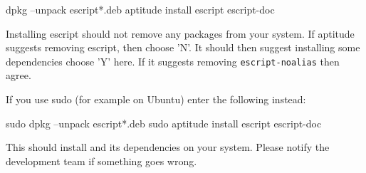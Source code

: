 \begin{shellCode}
dpkg --unpack escript*.deb
aptitude install escript escript-doc
\end{shellCode}

Installing escript should not remove any packages from your system.
If aptitude suggests removing escript, then choose 'N'.
It should then suggest installing some dependencies choose 'Y' here.
If it suggests removing \texttt{escript-noalias} then agree.

If you use sudo (for example on Ubuntu) enter the following instead:
\begin{shellCode}
sudo dpkg --unpack escript*.deb
sudo aptitude install escript escript-doc
\end{shellCode}

This should install \esfinley and its dependencies on your system.
Please notify the development team if something goes wrong.

